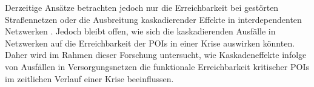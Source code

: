 Derzeitige Ansätze betrachten jedoch nur die Erreichbarkeit bei gestörten Straßennetzen oder die Ausbreitung kaskadierender Effekte in interdependenten Netzwerken \cite{kaub2024,lickert2024}.
Jedoch bleibt offen, wie sich die kaskadierenden Ausfälle in Netzwerken auf die Erreichbarkeit der POIs in einer Krise auswirken könnten.
Daher wird im Rahmen dieser Forschung untersucht, wie Kaskadeneffekte infolge von Ausfällen in Versorgungsnetzen die funktionale Erreichbarkeit kritischer POIs im zeitlichen Verlauf einer Krise beeinflussen.






